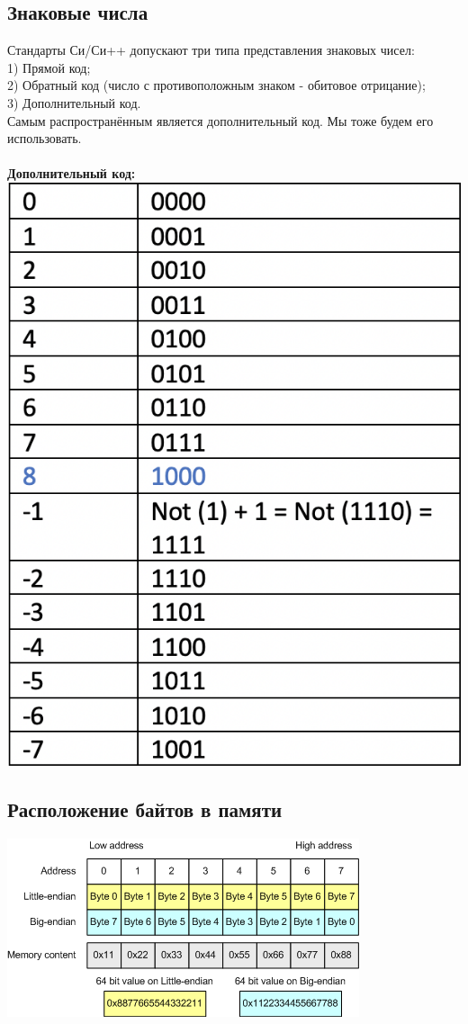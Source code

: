 \documentclass[12pt]{article}
\begin{document}
\subsection{Знаковые числа}
Стандарты Си/Си++ допускают три типа представления знаковых чисел: \\
1) Прямой код; \\
2) Обратный код (число с противоположным знаком - обитовое отрицание); \\
3) Дополнительный код. \\
Самым распространённым является дополнительный код. Мы тоже будем его использовать. \\
\\
{\bf Дополнительный код:} \\
\includegraphics[scale=0.5]{./30.11.png} \\

\subsection{Расположение байтов в памяти}
\includegraphics[scale=1]{./4.png} \\
\end{document}
